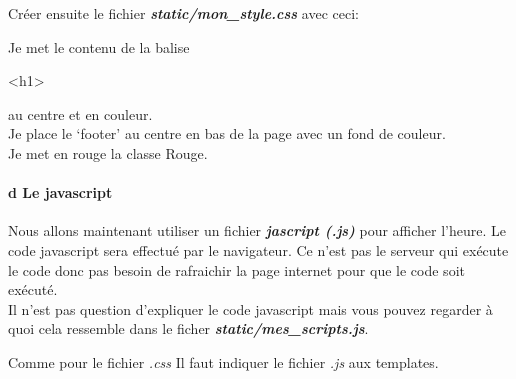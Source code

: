 \documentclass{article}
\newenvironment{Shaded}{}{}
\newcommand{\KeywordTok}[1]{\textcolor[rgb]{0.00,0.44,0.13}{\textbf{{#1}}}}
\newcommand{\DataTypeTok}[1]{\textcolor[rgb]{0.56,0.13,0.00}{{#1}}}
\newcommand{\FloatTok}[1]{\textcolor[rgb]{0.25,0.63,0.44}{{#1}}}
\newcommand{\ErrorTok}[1]{\textcolor[rgb]{1.00,0.00,0.00}{\textbf{{#1}}}}
\newcommand{\NormalTok}[1]{{#1}}
\begin{document}
Créer ensuite le fichier \textbf{\emph{static/mon\_style.css}} avec
ceci:

\begin{Shaded}
\end{Shaded}

Je met le contenu de la balise

\textless{}h1\textgreater{}

au centre et en couleur.\\Je place le `footer' au centre en bas de la
page avec un fond de couleur.\\Je met en rouge la classe Rouge.

\paragraph{d Le javascript}\label{d-le-javascript}

Nous allons maintenant utiliser un fichier \textbf{\emph{jascript
(.js)}} pour afficher l'heure. Le code javascript sera effectué par le
navigateur. Ce n'est pas le serveur qui exécute le code donc pas besoin
de rafraichir la page internet pour que le code soit exécuté.\\Il n'est
pas question d'expliquer le code javascript mais vous pouvez regarder à
quoi cela ressemble dans le ficher
\textbf{\emph{static/mes\_scripts.js}}.

Comme pour le fichier \emph{.css} Il faut indiquer le fichier \emph{.js}
aux templates.
\end{document}
